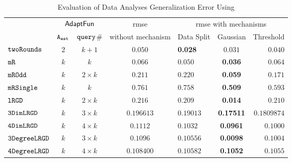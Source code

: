 {\footnotesize
\begin {table}[H]
        \caption{Evaluation of Data Analyses Generalization Error Using {\THESYSTEM}}
    \vspace{-0.4cm}
        \label{tb:adapt-generalization}
        \begin{center}
        \centering
{
        \begin{tabular}{|| >{\tiny}l || c | c || c || l | c | r ||  }
                \hhline{t|:======= :t:|}
        \multirow{2}{*}{Program $c$}
         & \multicolumn{2}{c||}{$\textsf{AdaptFun}$}
         & {rmse}
         & \multicolumn{3}{c||}{rmse with mechanisms} \\ 
         \hhline{||~--||~---||}
         & {${\mathtt{A_{est}}}$ } & {${\tt query}$\# } &  without mechanism & Data Split & Gaussian & Threshold  \\ 
        \hhline{|:t ======== t:|}
        $  \mathtt{ twoRounds }$ & $ 2 $ & $  k + 1 $ & $0.050$   & {\textbf{0.028}} & {$0.031$} & $0.040$  \\
        \hhline{||-||--||-||---||}
         $  \mathtt{ mR}$ & $k$ & $k$ & $0.066$   & $0.050$ & {\textbf{0.036}} & $0.064$  \\
         \hhline{||-||--||-||---||}
         $  \mathtt{ mROdd }$ & $ k $ & $  2 \times k $ & $0.211$   & $0.220$ & {\textbf{0.059}} & $0.171$  \\
         \hhline{||-||--||-||---||}
         $  \mathtt{ mRSingle }$ & $ k $ & $  k $ & $ 0.761$   & $ 0.758$ & {\textbf{0.509}} & $ 0.593$  \\
         \hhline{||-||--||-||---||}
         $  \mathtt{ lRGD }$ & $ k $ & $  2\times k $ & $0.216$   & $0.209$ & \textbf{0.014} & $0.210$  \\
         \hhline{||-||--||-||---||}
         $  \mathtt{ 3DimLRGD }$ & $ k $ & $  3\times k $ & $0.196613$   & $0.19013$ & \textbf{0.17511} & $0.1809874$  \\
         \hhline{||-||--||-||---||}
         $  \mathtt{ 4DimLRGD }$ & $ k $ & $  4\times k $ & $0.1112$   & $0.1032$ & \textbf{0.0961} & $0.1000$  \\
         \hhline{||-||--||-||---||}
         $  \mathtt{ 3DegreeLRGD }$ & $ k $ & $  3\times k $ & $0.1096$   & $0.10556$ & \textbf{0.0098} & $0.1004$  \\
         \hhline{||-||--||-||---||}
         $  \mathtt{ 4DegreeLRGD }$ & $ k $ & $  4\times k $ & $0.108400$   & $0.10582$ & \textbf{0.1052} & $0.1055$  \\

\end{tabular}}
\end{center}
\end{table}}
